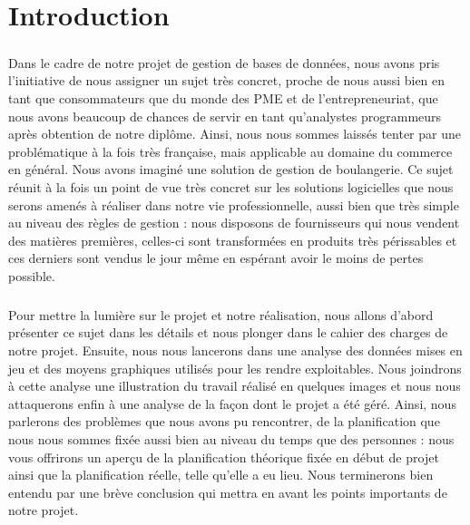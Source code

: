 \chapter*{Introduction}

\paragraph{}
    Dans le cadre de notre projet de gestion de bases de données,
    nous avons pris l'initiative de nous assigner un sujet très concret,
    proche de nous aussi bien en tant que consommateurs que du monde des PME et
    de l'entrepreneuriat, que nous avons beaucoup de chances de servir en tant
    qu'analystes programmeurs après obtention de notre diplôme.
    Ainsi, nous nous sommes laissés tenter par une problématique à la fois très
    française, mais applicable au domaine du commerce en général.
    Nous avons imaginé une solution de gestion de boulangerie.
    Ce sujet réunit à la fois un point de vue très concret sur les solutions
    logicielles que nous serons amenés à réaliser dans notre vie
    professionnelle, aussi bien que très simple au niveau des règles de
    gestion : nous disposons de fournisseurs qui nous vendent des matières
    premières, celles-ci sont transformées en produits très périssables et ces
    derniers sont vendus le jour même en espérant avoir le moins de pertes
    possible.
\paragraph{}
    Pour mettre la lumière sur le projet et notre réalisation, nous allons 
    d'abord présenter ce sujet dans les détails et nous plonger dans le cahier
    des charges de notre projet. Ensuite, nous nous lancerons dans une analyse
    des données mises en jeu et des moyens graphiques utilisés pour
    les rendre exploitables.
    Nous joindrons à cette analyse une illustration du travail réalisé en
    quelques images et nous nous attaquerons enfin à une analyse de la façon dont le
    projet a été géré. Ainsi, nous parlerons des problèmes que nous avons pu
    rencontrer, de la planification que nous nous sommes fixée aussi bien au
    niveau du temps que des personnes : nous vous offrirons un aperçu de la 
    planification théorique fixée en début de projet ainsi que la planification
    réelle, telle qu'elle a eu lieu. Nous terminerons bien entendu par une
    brève conclusion qui mettra en avant les points importants de notre projet.
